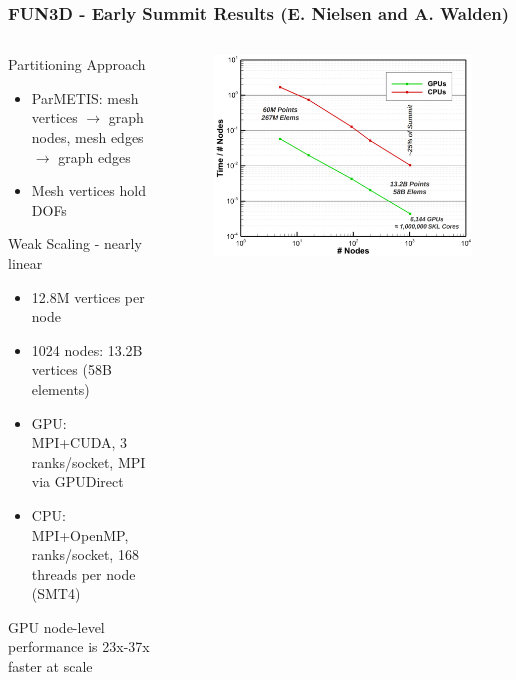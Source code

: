 \documentclass[aspectratio=169]{beamer}
\begin{document}
\begin{frame}
  \frametitle{FUN3D - Early Summit Results (E. Nielsen and A. Walden)}
  \begin{columns}
    \begin{column}{0.5\textwidth}
      Partitioning Approach
      \begin{itemize}
        \item ParMETIS: mesh vertices $\rightarrow$ graph nodes, 
          mesh edges $\rightarrow$ graph edges
        \item Mesh vertices hold DOFs
      \end{itemize}
      Weak Scaling - nearly linear
      \begin{itemize}
        \item 12.8M vertices per node
        \item 1024 nodes: 13.2B vertices (58B elements)
        \item GPU: MPI+CUDA, 3 ranks/socket, MPI via GPUDirect
        \item CPU: MPI+OpenMP, ranks/socket, 168 threads per node (SMT4)
      \end{itemize}
      GPU node-level performance is 23x-37x faster at scale
    \end{column}
    \begin{column}{0.5\textwidth}
      \begin{figure}
        \centering
        \includegraphics[width=\textwidth]{figures/fun3d-summit.png}
      \end{figure}
    \end{column}
  \end{columns}
\end{frame}
\end{document}
